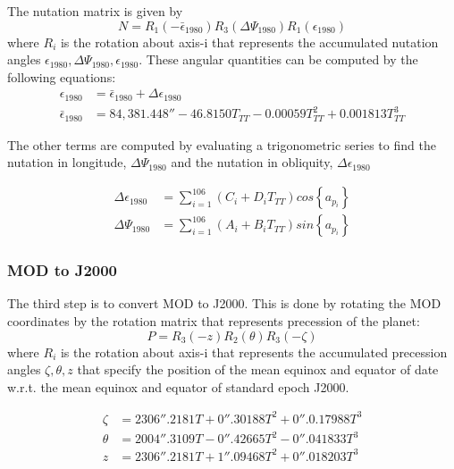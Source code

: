 \documentclass[12pt,letterpaper]{paper}
\begin{document}
The nutation matrix is given by
\begin{equation}
N = R_1(- \bar{\epsilon}_{1980})R_3(\Delta\Psi_{1980})R_1(\epsilon_{1980})
\end{equation}
where $R_i$ is the rotation about axis-i that represents the accumulated nutation angles $\epsilon_{1980}, \Delta\Psi_{1980}, \epsilon_{1980}$. These angular quantities can be computed by the following equations:
\begin{align}
\epsilon_{1980} &= \bar{\epsilon}_{1980} + \Delta \epsilon_{1980} \\
\bar{\epsilon}_{1980} &= 84,381.448'' - 46.8150T_{TT} - 0.00059T^2_{TT} + 0.001813 T^3_{TT}
\end{align}

The other terms are computed by evaluating a trigonometric series to find the nutation in longitude, $\Delta\Psi_{1980}$ and the nutation in obliquity,  $\Delta \epsilon_{1980}$

\begin{align}
\Delta \epsilon_{1980} &= \sum_{i=1}^{106} (C_i + D_i T_{TT})cos\left\lbrace{a_{p_i}}\right\rbrace \\
\Delta \Psi_{1980} &= \sum_{i=1}^{106} (A_i + B_i T_{TT})sin\left\lbrace{a_{p_i}}\right\rbrace
\end{align}



\subsubsection{MOD to J2000}
The third step is to convert MOD to J2000. This is done by rotating the MOD coordinates by the rotation matrix that represents precession of the planet:
\begin{equation}
P = R_3(-z)R_2(\theta)R_3(-\zeta)
\end{equation}
where $R_i$ is the rotation about axis-i that represents the accumulated precession angles $\zeta, \theta, z$ that specify the position of the mean equinox and equator of date w.r.t. the mean equinox and equator of standard epoch J2000.

\begin{align}
\zeta &= 2306''.2181T + 0''.30188T^2 + 0''.0.17988T^3\\
\theta &= 2004''.3109T - 0''.42665T^2 - 0''.041833T^3\\
z &= 2306''.2181T + 1''.09468T^2 + 0''.018203T^3
\end{align}
\end{document}
